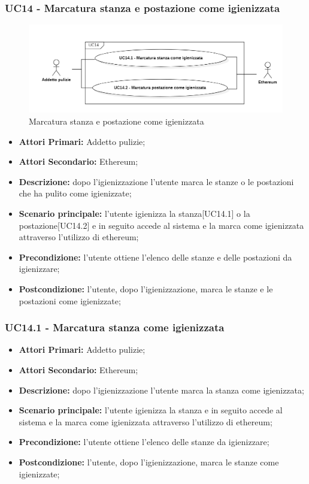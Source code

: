 \subsubsection{ UC14 - Marcatura stanza e postazione come igienizzata}
\begin{figure}[H]
		\centering
		\includegraphics[width=18cm]{res/images/UC14.png}
		\caption{Marcatura stanza e postazione come igienizzata}
		\label{fig:Marcatura stanza e postazione come igienizzata}
	\end{figure}
\begin{itemize}
           	\item\textbf{Attori Primari:} Addetto pulizie;
		\item\textbf{Attori Secondario:} Ethereum;
           	\item\textbf{Descrizione:} dopo l'igienizzazione l'utente marca le stanze o le postazioni che ha pulito come igienizzate;
           	\item\textbf{Scenario principale:} l'utente igienizza la stanza[UC14.1] o la postazione[UC14.2] e in seguito accede al sistema e la marca come igienizzata attraverso l'utilizzo di ethereum;
           	\item\textbf{Precondizione:} l'utente ottiene l'elenco delle stanze e delle postazioni da igienizzare;
           	\item\textbf{Postcondizione:} l'utente, dopo l'igienizzazione, marca le stanze e le postazioni come igienizzate;
\end{itemize}
\subsubsection{UC14.1 - Marcatura stanza come igienizzata}
\begin{itemize}
           	\item\textbf{Attori Primari:} Addetto pulizie;
		\item\textbf{Attori Secondario:} Ethereum;
           	\item\textbf{Descrizione:} dopo l'igienizzazione l'utente marca la stanza come igienizzata;
           	\item\textbf{Scenario principale:} l'utente igienizza la stanza e in seguito accede al sistema e la marca come igienizzata attraverso l'utilizzo di ethereum;
           	\item\textbf{Precondizione:} l'utente ottiene l'elenco delle stanze da igienizzare;
           	\item\textbf{Postcondizione:} l'utente, dopo l'igienizzazione, marca le stanze come igienizzate;
\end{itemize}
